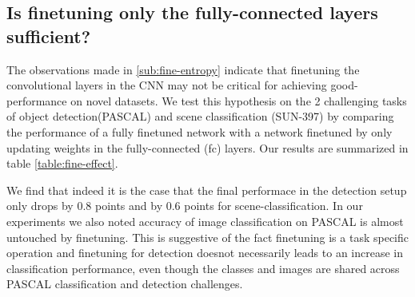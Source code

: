 \documentclass[runningheads]{llncs}
\begin{document}
\subsection{Is finetuning only the fully-connected layers sufficient?}
\label{sub:fine-fc-only}
The observations made in \ref{sub:fine-entropy} indicate that finetuning the convolutional layers in the CNN may not be critical for achieving good-performance on novel datasets. We test this hypothesis on the 2 challenging tasks of object detection(PASCAL) and scene classification (SUN-397) by comparing the performance of a fully finetuned network with a network finetuned by only updating weights in the fully-connected (fc) layers. Our results are summarized in table \ref{table:fine-effect}.

\setlength{\tabcolsep}{2pt}
\begin{table}[t!]
\begin{center}
\caption{Comparison in performance on of Alex-Net, Finetuned Network(ft-net) and a network with only fc layers finetuned (fc-ft).}
\label{table:fine-effect}
\end{center}
\end{table}
\setlength{\tabcolsep}{1.4pt}

We find that indeed it is the case that the final performace in the detection setup only drops by 0.8 points and by 0.6 points for scene-classification. In our experiments we also noted accuracy of image classification on PASCAL is almost untouched by finetuning. This is suggestive of the fact finetuning is a task specific operation and finetuning for detection doesnot necessarily leads to an increase in classification performance, even though the classes and images are shared across PASCAL classification and detection challenges. 
\end{document}
